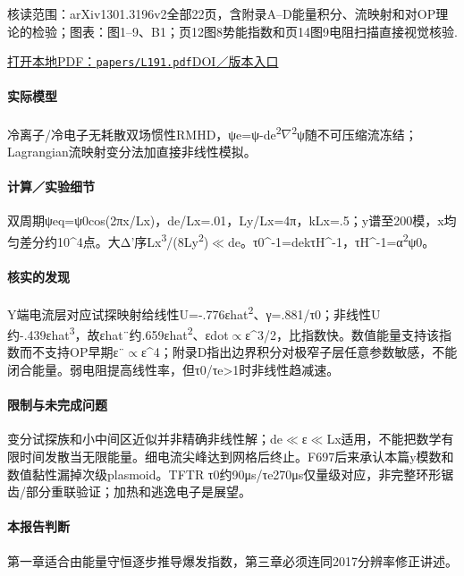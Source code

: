 \textsf{核读范围：}arXiv1301.3196v2全部22页，含附录A–D能量积分、流映射和对OP理论的检验；\textsf{图表：}图1–9、B1；页12图8势能指数和页14图9电阻扫描直接视觉核验.

\href{run:papers/L191.pdf}{打开本地PDF：\texttt{papers/L191.pdf}}\quad\href{https://doi.org/10.1088/0029-5515/53/6/063024}{DOI／版本入口}

\paragraph{实际模型}冷离子/冷电子无耗散双场惯性RMHD，ψe=ψ-de\textsuperscript{2}\ensuremath{\nabla}\textsuperscript{2}ψ随不可压缩流冻结；Lagrangian流映射变分法加直接非线性模拟。

\paragraph{计算／实验细节}双周期ψeq=ψ0cos(2πx/Lx)，de/Lx=.01，Ly/Lx=4π，kLx=.5；y谱至200模，x均匀差分约10\textasciicircum{}4点。大Δ'序Lx\textsuperscript{3}/(8Ly\textsuperscript{2})\ensuremath{\ll}de。τ0\textasciicircum{}-1=dekτH\textasciicircum{}-1，τH\textasciicircum{}-1=α\textsuperscript{2}ψ0。

\paragraph{核实的发现}Y端电流层对应试探映射给线性U=-.776εhat\textsuperscript{2}、γ=.881/τ0；非线性U约-.439εhat\textsuperscript{3}，故εhat¨约.659εhat\textsuperscript{2}、εdot\ensuremath{\propto}ε\textasciicircum{}3/2，比指数快。数值能量支持该指数而不支持OP早期ε¨\ensuremath{\propto}ε\textasciicircum{}4；附录D指出边界积分对极窄子层任意参数敏感，不能闭合能量。弱电阻提高线性率，但τ0/τe>1时非线性趋减速。

\paragraph{限制与未完成问题}变分试探族和小中间区近似并非精确非线性解；de\ensuremath{\ll}ε\ensuremath{\ll}Lx适用，不能把数学有限时间发散当无限能量。细电流尖峰达到网格后终止。F697后来承认本篇y模数和数值黏性漏掉次级plasmoid。TFTR τ0约90μs/τe270μs仅量级对应，非完整环形锯齿/部分重联验证；加热和逃逸电子是展望。

\paragraph{本报告判断}第一章适合由能量守恒逐步推导爆发指数，第三章必须连同2017分辨率修正讲述。

